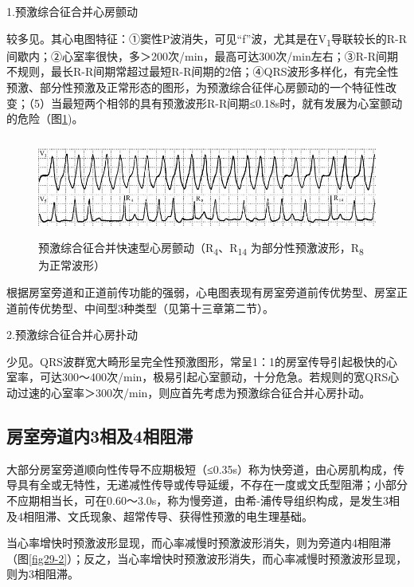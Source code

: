 1.预激综合征合并心房颤动

较多见。其心电图特征：①窦性P波消失，可见“f”波，尤其是在V\textsubscript{1}导联较长的R-R间歇内；②心室率很快，多＞200次/min，最高可达300次/min左右；③R-R间期不规则，最长R-R间期常超过最短R-R间期的2倍；④QRS波形多样化，有完全性预激、部分性预激及正常形态的图形，为预激综合征伴心房颤动的一个特征性改变；（5）当最短两个相邻的具有预激波形R-R间期≤0.18s时，就有发展为心室颤动的危险（图\ref{fig29-7})。

\begin{figure}[!htbp]
 \centering
 \includegraphics[width=5.61458in,height=1.29167in]{./images/Image00491.jpg}
 \captionsetup{justification=centering}
 \caption{预激综合征合并快速型心房颤动（R\textsubscript{4}、R\textsubscript{14} 为部分性预激波形，R\textsubscript{8} 为正常波形）}
 \label{fig29-7}
  \end{figure} 


根据房室旁道和正道前传功能的强弱，心电图表现有房室旁道前传优势型、房室正道前传优势型、中间型3种类型（见第十三章第二节）。

2.预激综合征合并心房扑动

少见。QRS波群宽大畸形呈完全性预激图形，常呈1：1的房室传导引起极快的心室率，可达300～400次/min，极易引起心室颤动，十分危急。若规则的宽QRS心动过速的心室率＞300次/min，则应首先考虑为预激综合征合并心房扑动。

\protect\hypertarget{text00036.htmlux5cux23subid425}{}{}

\subsection{房室旁道内3相及4相阻滞}

大部分房室旁道顺向性传导不应期极短（≤0.35s）称为快旁道，由心房肌构成，传导具有全或无特性，无递减性传导或传导延缓，不存在一度或文氏型阻滞；小部分不应期相当长，可在0.60～3.0s，称为慢旁道，由希-浦传导组织构成，是发生3相及4相阻滞、文氏现象、超常传导、获得性预激的电生理基础。

当心率增快时预激波形显现，而心率减慢时预激波形消失，则为旁道内4相阻滞（图\ref{fig29-2}）；反之，当心率增快时预激波形消失，而心率减慢时预激波形显现，则为3相阻滞。

